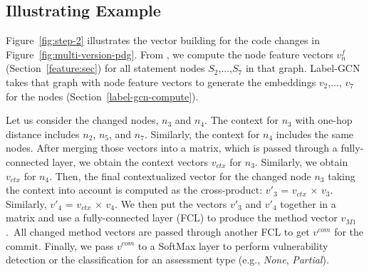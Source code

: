 
\subsection{Illustrating Example}

Figure~\ref{fig:step-2} illustrates the vector building for the code
changes in Figure~\ref{fig:multi-version-pdg}. From
{\mvpdgxy}, we compute the node feature vectors $v^{f}_n$
(Section~\ref{feature:sec}) for all statement nodes $S_2$,...,$S_7$ in
that graph. Label-GCN takes that graph with node feature vectors to
generate the embeddings $v_2$,..., $v_7$ for the nodes
(Section~\ref{label-gcn-compute}).


Let us consider the changed nodes, $n_3$ and $n_4$. The context for
$n_3$ with one-hop distance includes $n_2$, $n_5$, and
$n_7$. Similarly, the context for $n_4$ includes the same nodes. After
merging those vectors into a matrix, which is passed through a
fully-connected layer, we obtain the context vectors $v_{ctx}$ for
$n_3$. Similarly, we obtain $v_{ctx}$ for $n_4$. Then, the final
contextualized vector for the changed node $n_3$ taking the context
into account is computed as the cross-product: $v'_3$ = $v_{ctx}$
$\times$ $v_3$. Similarly, $v'_4$ = $v_{ctx}$ $\times$ $v_4$.
%
We then put the vectors $v'_3$ and $v'_4$ together in a matrix and use
a fully-connected layer (FCL) to produce the method vector
$v_{M1}$.~All changed method vectors are passed through another FCL to
get $v^{com}$ for the commit. Finally, we pass $v^{com}$ to a SoftMax
layer to perform vulnerability detection or the classification for an
assessment type (e.g., {\em None}, {\em Partial}).

